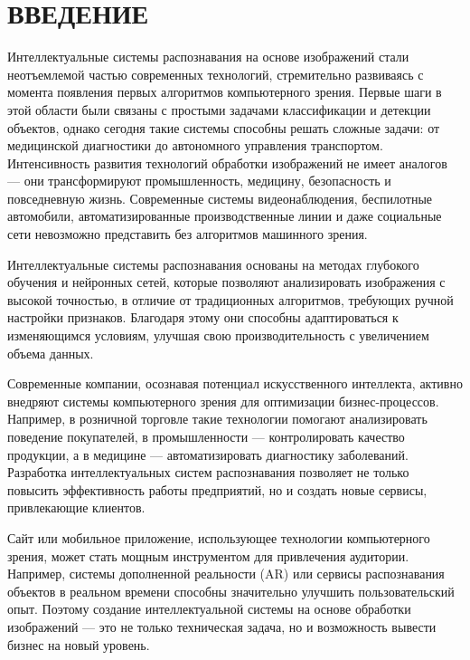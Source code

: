 \section*{ВВЕДЕНИЕ}

Интеллектуальные системы распознавания на основе изображений стали неотъемлемой частью современных технологий, стремительно развиваясь с момента появления первых алгоритмов компьютерного зрения. Первые шаги в этой области были связаны с простыми задачами классификации и детекции объектов, однако сегодня такие системы способны решать сложные задачи: от медицинской диагностики до автономного управления транспортом. Интенсивность развития технологий обработки изображений не имеет аналогов — они трансформируют промышленность, медицину, безопасность и повседневную жизнь. Современные системы видеонаблюдения, беспилотные автомобили, автоматизированные производственные линии и даже социальные сети невозможно представить без алгоритмов машинного зрения.

Интеллектуальные системы распознавания основаны на методах глубокого обучения и нейронных сетей, которые позволяют анализировать изображения с высокой точностью, в отличие от традиционных алгоритмов, требующих ручной настройки признаков. Благодаря этому они способны адаптироваться к изменяющимся условиям, улучшая свою производительность с увеличением объема данных.

Современные компании, осознавая потенциал искусственного интеллекта, активно внедряют системы компьютерного зрения для оптимизации бизнес-процессов. Например, в розничной торговле такие технологии помогают анализировать поведение покупателей, в промышленности — контролировать качество продукции, а в медицине — автоматизировать диагностику заболеваний. Разработка интеллектуальных систем распознавания позволяет не только повысить эффективность работы предприятий, но и создать новые сервисы, привлекающие клиентов.

Сайт или мобильное приложение, использующее технологии компьютерного зрения, может стать мощным инструментом для привлечения аудитории. Например, системы дополненной реальности (AR) или сервисы распознавания объектов в реальном времени способны значительно улучшить пользовательский опыт. Поэтому создание интеллектуальной системы на основе обработки изображений — это не только техническая задача, но и возможность вывести бизнес на новый уровень.

